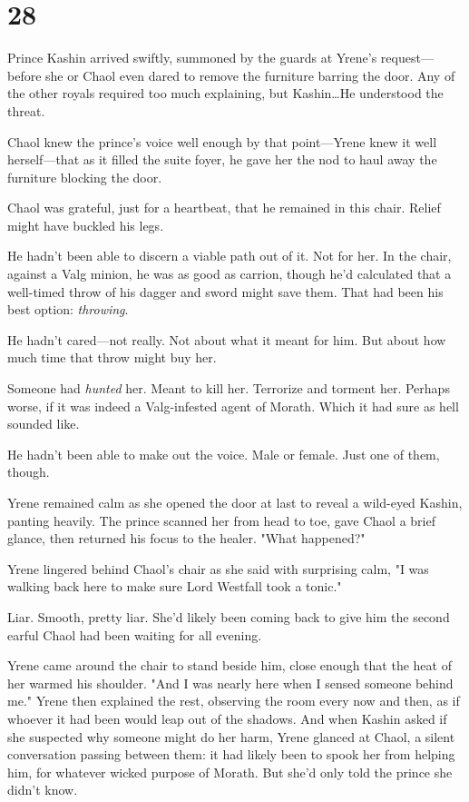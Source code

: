 
\chapter{28}

Prince Kashin arrived swiftly, summoned by the guards at Yrene's request--- before she or Chaol even dared to remove the furniture barring the door.
Any of the other royals required too much explaining, but Kashin\ldots He understood the threat.

Chaol knew the prince's voice well enough by that point---Yrene knew it well herself---that as it filled the suite foyer, he gave her the nod to haul away the furniture blocking the door.

Chaol was grateful, just for a heartbeat, that he remained in this chair.
Relief might have buckled his legs.

He hadn't been able to discern a viable path out of it.
Not for her.
In the chair, against a Valg minion, he was as good as carrion, though he'd calculated that a well-timed throw of his dagger and sword might save them.
That had been his best option: \emph{throwing}.

He hadn't cared---not really.
Not about what it meant for him.
But about how much time that throw might buy her.

Someone had \emph{hunted} her.
Meant to kill her.
Terrorize and torment her.
Perhaps worse, if it was indeed a Valg-infested agent of Morath.
Which it had sure as hell sounded like.

He hadn't been able to make out the voice.
Male or female.
Just one of them, though.

Yrene remained calm as she opened the door at last to reveal a wild-eyed Kashin, panting heavily.
The prince scanned her from head to toe, gave Chaol a brief glance, then returned his focus to the healer.
"What happened?"

Yrene lingered behind Chaol's chair as she said with surprising calm, "I was walking back here to make sure Lord Westfall took a tonic."

Liar.
Smooth, pretty liar.
She'd likely been coming back to give him the second earful Chaol had been waiting for all evening.

Yrene came around the chair to stand beside him, close enough that the heat of her warmed his shoulder.
"And I was nearly here when I sensed someone behind me."
Yrene then explained the rest, observing the room every now and then, as if whoever it had been would leap out of the shadows.
And when Kashin asked if she suspected why someone might do her harm, Yrene glanced at Chaol, a silent conversation passing between them: it had likely been to spook her from helping him, for whatever wicked purpose of Morath.
But she'd only told the prince she didn't know.

